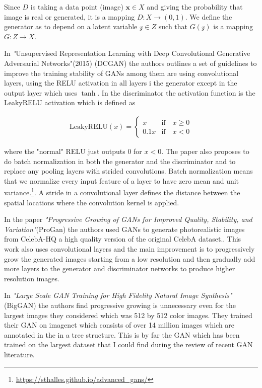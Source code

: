 Since $D$ is taking a data point (image) $\mathbf{x}\in X$ and giving the probability that image is real or generated, it is a mapping $D:X \to (0,1)$. We define the generator as to depend on a latent variable $\mathcal{z}\in Z$ such that $G(\mathcal{z})$ is a mapping $G:Z\to X$.




In \textit"{Unsupervised Representation Learning with Deep Convolutional Generative Adversarial Networks"}(2015) (DCGAN)\cite{dcgan} the authors outlines a set of guidelines to improve the training stability of GANs among them are using convolutional layers, using the RELU activation in all layers i the generator except in the output layer which uses $\tanh$. In the discriminator the activation function is  the LeakyRELU activation which is defined as

\begin{align}
  \text{LeakyRELU}(x) =
  \begin{cases}
    x & \text{if}\quad x\geq0\\
    0.1x & \text{if}\quad x<0
  \end{cases}
\end{align}

where the "normal" RELU just outputs $0$ for $x<0$. The paper also proposes to do batch normalization in both the generator and the discriminator and to replace any pooling layers with strided convolutions. Batch normalization means that we normalize every input feature of a layer to have zero mean and unit variance.\footnote{\url{https://sthalles.github.io/advanced_gans/}}. A stride in a convolutional layer defines the distance between the spatial locations where the convolution kernel is applied.

In the paper \textit{"Progressive Growing of GANs for Improved Quality, Stability, and Variation"}(ProGan)\cite{progan} the authors used GANs to generate photorealistic images from CelebA-HQ a high quality version of the original CelebA dataset.\cite{celebA}. This work also uses convolutional layers and the main improvement is to progressively grow the generated images starting from a low resolution and then gradually add more layers to the generator and discriminator networks to produce higher resolution images.

In \textit{"Large Scale GAN Training for High Fidelity Natural Image Synthesis"}(BigGAN) \cite{biggan} the authors find progressive growing is unnecessary even for the largest images they considered which was 512 by 512 color images. They trained their GAN on imagenet which consists of over 14 million images which are annotated in the in a tree structure.\cite{imagenet} This is by far the GAN which has been trained on the largest dataset that I could find during the review of recent GAN literature.

